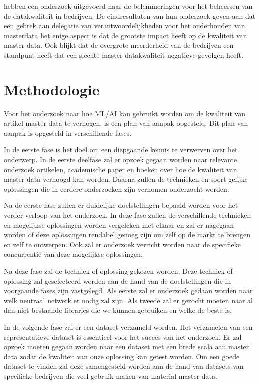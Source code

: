 \textcite{ Haug2011a} hebben een onderzoek uitgevoerd naar de belemmeringen voor het beheersen van de datakwaliteit in bedrijven. De eindresultaten van hun onderzoek geven aan dat een gebrek aan delegatie van verantwoordelijkheden voor het onderhouden van masterdata het enige aspect is dat de grootste impact heeft op de kwaliteit van master data. Ook blijkt dat de overgrote meerderheid van de bedrijven een standpunt heeft dat een slechte master datakwaliteit negatieve gevolgen heeft. 

\section{Methodologie}%
\label{sec:methodologie}

Voor het onderzoek naar hoe ML/AI kan gebruikt worden om de kwaliteit van artikel master data te verhogen, is een plan van aanpak opgesteld. Dit plan van aanpak is opgesteld in verschillende fases. 

In de eerste fase is het doel om een diepgaande kennis te verwerven over het onderwerp. In de eerste deelfase zal er opzoek gegaan worden naar relevante onderzoek artikelen, academische paper en boeken over hoe de kwaliteit van master data verhoogd kan worden. Daarna zullen de technieken en soort gelijke oplossingen die in eerdere onderzoeken zijn vernomen onderzocht worden. 

Na de eerste fase zullen er duidelijke doelstellingen bepaald worden voor het verder verloop van het onderzoek. In deze fase zullen de verschillende technieken en mogelijkse oplossingen worden vergeleken met elkaar en zal er nagegaan worden of deze oplossingen rendabel genoeg zijn om zelf op de markt te brengen en zelf te ontwerpen. Ook zal er onderzoek verricht worden naar de specifieke concurrentie van deze mogelijkse oplossingen. 

Na deze fase zal de techniek of oplossing gekozen worden. Deze techniek of oplossing zal geselecteerd worden aan de hand van de doelstellingen die in voorgaande fases zijn vastgelegd. Als eerste zal er onderzoek gedaan worden naar welk neutraal netwerk er nodig zal zijn. Als tweede zal er gezocht moeten naar al dan niet bestaande libraries die we kunnen gebruiken en welke de beste is.

In de volgende fase zal er een dataset verzameld worden. Het verzamelen van een representatieve dataset is essentieel voor het succes van het onderzoek. Er zal opzoek moeten gegaan worden naar een dataset met een brede scala aan master data zodat de kwaliteit van onze oplossing kan getest worden. Om een goede dataset te vinden zal deze samengesteld worden aan de hand van datasets van specifieke bedrijven die veel gebruik maken van material master data.

